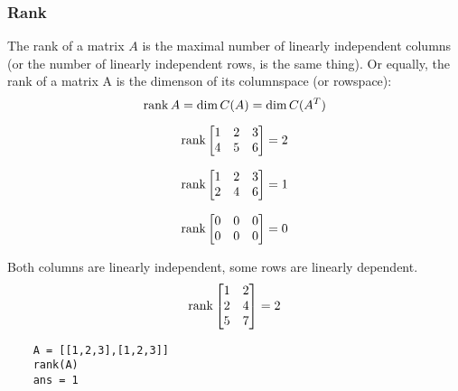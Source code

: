 \subsubsection{Rank}
The rank of a matrix \(A\) is the maximal number of linearly independent columns
(or the number of linearly independent rows, is the same thing). Or equally, the rank
of a matrix A is the dimenson of its columnspace (or rowspace):
\begin{equation}
    \operatorname{rank} A = \dim C(A) = \dim C(A^T)
\end{equation}
\begin{example}
    \begin{equation*}
        \operatorname{rank} \begin{bmatrix}
            1 & 2 & 3 \\
            4 & 5 & 6
        \end{bmatrix} = 2
    \end{equation*}
\end{example}
\begin{example}
    \begin{equation*}
        \operatorname{rank} \begin{bmatrix}
            1 & 2 & 3 \\
            2 & 4 & 6
        \end{bmatrix}  = 1 \\
    \end{equation*}
\end{example}
\begin{example}
    \begin{equation*}
        \operatorname{rank} \begin{bmatrix}
            0 & 0 & 0 \\
            0 & 0 & 0
        \end{bmatrix} = 0
    \end{equation*}
\end{example}
\begin{example}
    Both columns are linearly independent, some rows are linearly dependent.
    \begin{equation*}
        \operatorname{rank} \begin{bmatrix}
            1 & 2 \\ 2 & 4 \\ 5 & 7
        \end{bmatrix} = 2
    \end{equation*}
\end{example}
\begin{matlab}
    \begin{lstlisting}
    A = [[1,2,3],[1,2,3]]
    rank(A)
    ans = 1
    \end{lstlisting}
\end{matlab}
